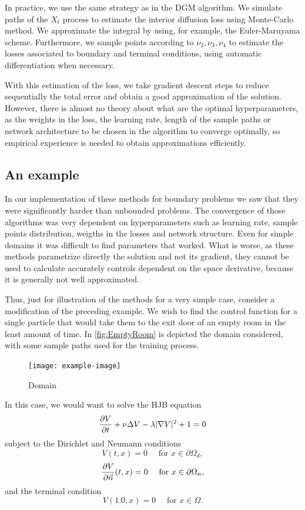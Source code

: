 In practice, we use the same strategy as in the DGM algorithm. We simulate paths  of the $X_t$ process to estimate the interior diffusion loss using Monte-Carlo method. We approximate the integral by using, for example, the Euler-Maruyama scheme. Furthermore, we sample points according to $\nu_2,\nu_3,\nu_4$ to estimate the losses associated to boundary and terminal conditions, using automatic differentiation when necessary. 

With this estimation of the loss, we take gradient descent steps to reduce sequentially the total error and obtain a good approximation of the solution. However, there is almost no theory about what are the optimal hyperparameters, as the weights in the loss, the learning rate, length of the sample paths or network architecture to be chosen in the algorithm to converge optimally, so empirical experience is needed to obtain approximations efficiently.


\subsection{An example}
In our implementation of these methods for boundary problems we saw that they were significantly harder than unbounded problems. The convergence of those algorithms was very dependent on hyperparameters such as learning rate, sample points distribution, weigths in the losses and network structure. Even for simple domains it was difficult to find parameters that worked. What is worse, as these methods parametrize directly the solution and not its gradient, they cannot be used to calculate accurately controls dependent on the space derivative, because it is generally not well approximated.   

Thus, just for illustration of the methods for a very simple case, consider a modification of the preceding example. We wish to find the control function for a single particle that would take them to the exit door of an empty room in the least amount of time. In \autoref{fig:EmptyRoom} is depicted the domain considered, with some sample paths used for the training process.

\begin{figure}[H]
	\centering
	\texttt{[image: example-image]}
	\caption{Domain}
	\label{fig:EmptyRoom}
\end{figure}

In this case, we would want to solve the HJB equation
\begin{equation}
	\label{eqn:HJB2D}
	\frac{\partial V}{\partial t}+\nu \Delta V -\lambda |\nabla V|^2+1=0
\end{equation} 
subject to the Dirichlet and Neumann conditions
\begin{equation}
	V(t,x)=0 \quad \text{ for } x\in \partial\Omega_d, 
\end{equation}
\begin{equation}
	\frac{\partial V}{\partial \vec{n}}(t,x)=0 \quad \text{ for } x\in \partial\Omega_n, 
\end{equation}
and the terminal condition
\begin{equation}
	V(1.0,x)=0 \quad \text{ for } x\in \Omega.
\end{equation}

